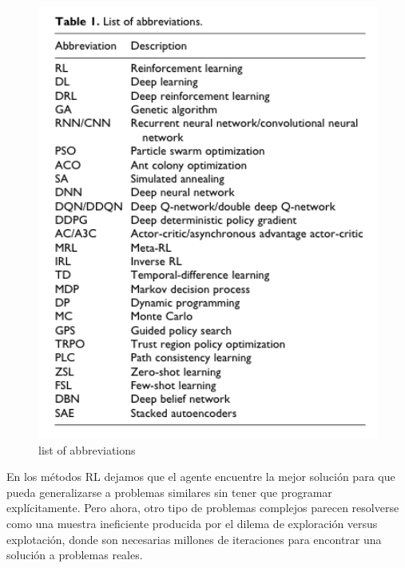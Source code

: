 \documentclass{svproc}
\begin{document}
\begin{figure}[ht]
    \centering
    \includegraphics[width=1\textwidth]{figures/list-abbreviations.png}
    \caption{list of abbreviations}
    \label{fig:list_abbreviations}
\end{figure}


En los métodos RL dejamos que el agente encuentre la mejor solución para que pueda generalizarse a problemas similares sin tener que programar explícitamente. Pero ahora, otro tipo de problemas complejos parecen resolverse como una muestra ineficiente producida por el dilema de exploración versus explotación, donde son necesarias millones de iteraciones para encontrar una solución a problemas reales.
\end{document}
